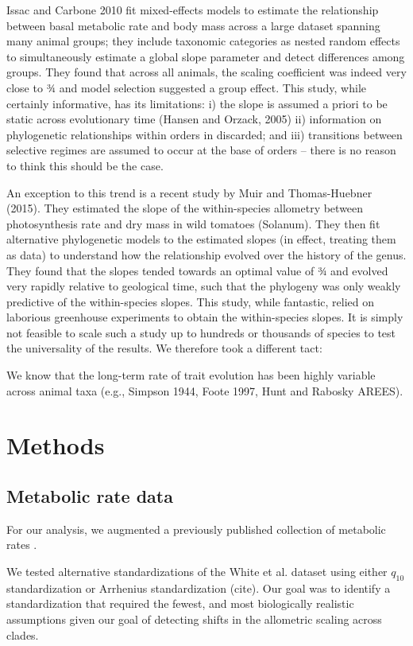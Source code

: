 \documentclass[a4paper,11pt]{article}
\begin{document}
Issac and Carbone 2010 fit mixed-effects models to estimate the relationship between basal metabolic rate and body mass across a large dataset spanning many animal groups; they include taxonomic categories as nested random effects to simultaneously estimate a global slope parameter and detect differences among groups. They found that across all animals, the scaling coefficient was indeed very close to ¾ and model selection suggested a group effect. This study, while certainly informative, has its limitations: i) the slope is assumed a priori to be static across evolutionary time (Hansen and Orzack, 2005) ii) information on phylogenetic relationships within orders in discarded; and iii) transitions between selective regimes are assumed to occur at the base of orders -- there is no reason to think this should be the case.

An exception to this trend is a recent study by Muir and Thomas-Huebner (2015). They estimated the slope of the within-species allometry between photosynthesis rate and dry mass in wild tomatoes (Solanum). They then fit alternative phylogenetic models to the estimated slopes (in effect, treating them as data) to understand how the relationship evolved over the history of the genus. They found that the slopes tended towards an optimal value of ¾ and evolved very rapidly relative to geological time, such that the phylogeny was only weakly predictive of the within-species slopes. This study, while fantastic, relied on laborious greenhouse experiments to obtain the within-species slopes. It is simply not feasible to scale such a study up to hundreds or thousands of species to test the universality of the results. We therefore took a different tact: 

We know that the long-term rate of trait evolution has been highly variable across animal taxa (e.g., Simpson 1944, Foote 1997, Hunt and Rabosky AREES).

\section*{Methods}

\subsection*{Metabolic rate data}
For our analysis, we augmented a previously published collection of metabolic rates \citep{white2006}.

We tested alternative standardizations of the White et al. dataset using either $q_{10}$ standardization or Arrhenius standardization (cite). Our goal was to identify a standardization that required the fewest, and most biologically realistic assumptions given our goal of detecting shifts in the allometric scaling across clades. 
\end{document}
